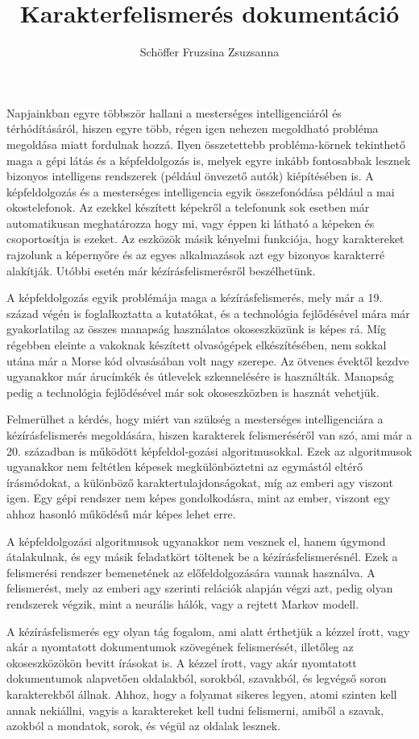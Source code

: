 \documentclass[hidelinks,12pt,a4paper]{report}
\author{Schöffer Fruzsina Zsuzsanna}
\title{Karakterfelismerés dokumentáció}
\begin{document}
	
	\cimoldal{}
	\doublespacing
	\tableofcontents
	\singlespacing
	

	Napjainkban egyre többször hallani a mesterséges intelligenciáról és térhódításáról, hiszen egyre több, régen igen nehezen megoldható probléma megoldása miatt fordulnak hozzá.
Ilyen összetettebb 
probléma-körnek tekinthető maga a gépi látás és a képfeldolgozás is, melyek egyre inkább fontosabbak lesznek bizonyos intelligens rendszerek (például önvezető autók) kiépítésében is.
A képfeldolgozás és a mesterséges intelligencia egyik összefonódása például a mai okostelefonok. Az ezekkel készített képekről a telefonunk sok esetben már automatikusan meghatározza hogy mi, vagy éppen ki látható a képeken és csoportosítja is ezeket.
Az eszközök másik kényelmi funkciója, hogy karaktereket rajzolunk a képernyőre és az egyes alkalmazások azt egy bizonyos karakterré alakítják. Utóbbi esetén már kézírásfelismerésről beszélhetünk.

A képfeldolgozás egyik problémája maga a kézírásfelismerés, mely már a 19. század végén is foglalkoztatta a kutatókat, és a technológia fejlődésével mára már gyakorlatilag az összes manapság használatos okoseszközünk is képes rá.
Míg régebben eleinte a vakoknak készített olvasógépek elkészítésében, nem sokkal utána már a Morse kód olvasásában volt nagy szerepe. Az ötvenes évektől kezdve ugyanakkor már árucímkék és útlevelek szkennelésére is használták. Manapság pedig a technológia fejlődésével már sok okoseszközben is hasznát vehetjük.

Felmerülhet a kérdés, hogy miért van szükség a mesterséges intelligenciára a kézírásfelismerés megoldására, hiszen karakterek felismeréséről van szó, ami már a 20. században is működött képfeldol-gozási algoritmusokkal.
Ezek az algoritmusok ugyanakkor nem feltétlen képesek megkülönböztetni az egymástól eltérő írásmódokat, a különböző karaktertulajdonságokat, míg az emberi agy viszont igen.
Egy gépi rendszer nem képes gondolkodásra, mint az ember, viszont egy ahhoz hasonló működésű már képes lehet erre.

A képfeldolgozási algoritmusok ugyanakkor nem vesznek el, hanem úgymond átalakulnak, és egy másik feladatkört töltenek be a kézírásfelismerésnél. Ezek a felismerési rendszer bemenetének az előfeldolgozására vannak használva.
A felismerést, mely az emberi agy szerinti relációk alapján végzi azt, pedig olyan rendszerek végzik, mint a neurális hálók, vagy a rejtett Markov modell.

A kézírásfelismerés egy olyan tág fogalom, ami alatt érthetjük a kézzel írott, vagy akár a nyomtatott dokumentumok szövegének felismerését, illetőleg az okoseszközökön bevitt írásokat is.
A kézzel írott, vagy akár nyomtatott dokumentumok alapvetően oldalakból, sorokból, szavakból, és legvégső soron karakterekből állnak. Ahhoz, hogy a folyamat sikeres legyen, atomi szinten kell annak nekiállni, vagyis a karaktereket kell tudni felismerni, amiből a szavak, azokból a mondatok, sorok, és végül az oldalak lesznek.
\end{document}
